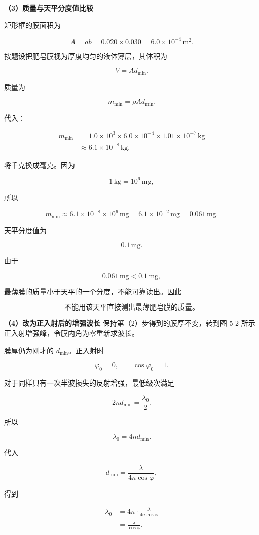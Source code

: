 \documentclass[12pt,a4paper,UTF8]{ctexart}
\begin{document}
\textbf{（3）质量与天平分度值比较}

矩形框的膜面积为

\[A=ab
=0.020\times0.030
=6.0\times10^{-4}\,\mathrm{m^2}.\]

按题设把肥皂膜视为厚度均匀的液体薄层，其体积为

\[V=Ad_{\min}.\]

质量为

\[m_{\min}=\rho Ad_{\min}.\]

代入：

\[\begin{aligned}
m_{\min}
&=1.0\times10^3
\times6.0\times10^{-4}
\times1.01\times10^{-7}\,\mathrm{kg}\\
&\approx6.1\times10^{-8}\,\mathrm{kg}.
\end{aligned}\]

将千克换成毫克。因为

\[1\,\mathrm{kg}=10^6\,\mathrm{mg},\]

所以

\[m_{\min}
\approx6.1\times10^{-8}\times10^6\,\mathrm{mg}
=6.1\times10^{-2}\,\mathrm{mg}
=0.061\,\mathrm{mg}.\]

天平分度值为

\[0.1\,\mathrm{mg}.\]

由于

\[0.061\,\mathrm{mg}<0.1\,\mathrm{mg},\]

最薄膜的质量小于天平的一个分度，不能可靠读出。因此

\[\boxed{\text{不能用该天平直接测出最薄肥皂膜的质量。}}\]

\textbf{（4）改为正入射后的增强波长} 保持第（2）步得到的膜厚不变，转到图
5-2 所示正入射增强峰，令膜内角为零重新求波长。

膜厚仍为刚才的 \(d_{\min}\)。正入射时

\[\varphi_0=0,\qquad \cos\varphi_0=1.\]

对于同样只有一次半波损失的反射增强，最低级次满足

\[2nd_{\min}=\frac{\lambda_0}{2}.\]

所以

\[\lambda_0=4nd_{\min}.\]

代入

\[d_{\min}=\frac{\lambda}{4n\cos\varphi},\]

得到

\[\begin{aligned}
\lambda_0
&=4n\cdot\frac{\lambda}{4n\cos\varphi}\\
&=\frac{\lambda}{\cos\varphi}.
\end{aligned}\]
\end{document}
